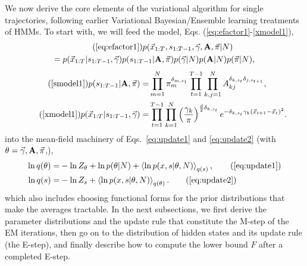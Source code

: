 We now derive the core elements of the variational algorithm for
single trajectories, following earlier Variational Bayesian/Ensemble
learning treatments of HMMs\cite{Bronson2010,Mackay1997,Beal2003}.  To
start with, we will feed the model,
Eqs. (\ref{eq:efactor1}-\ref{xmodel1}),
\begin{multline}
\tag{\ref{eq:efactor1}}
p(\x_{1:T},s_{1:T-1},\vec{\gamma},\matris{A},\vec\pi|N)\\
=p(\x_{1:T}|s_{1:T-1},\vec{\gamma})
p(s_{1:T-1}|\matris{A},\vec\pi)p(\vec{\gamma}|N)p(\matris{A}|N)p(\vec\pi|N),
\end{multline}
\begin{align}
\tag{\ref{smodel1}}
  p(s_{1:T-1}|\matris{A},\vec{\pi})=&
  \prod_{m=1}^N\pi_m^{\delta_{m,s_1}}
  \prod_{t=1}^{T-1}\prod_{k,j=1}^N A_{kj}^{\delta_{k,s_t}\delta_{j,s_{t+1}}},\\
    \tag{\ref{xmodel1}}
    p(\x_{1:T}|s_{1:T-1},\vec\gamma)=&
    \prod_{t=1}^{T-1}\prod_{k=1}^N\left(
    \frac{\gamma_k}{\pi}\right)^{\frac d2\delta_{k,s_t}}
    e^{-\delta_{k,s_t}\gamma_k(\x_{t+1}-\x_t)^2}. 
\end{align}
into the mean-field machinery of Eqs.~\eqref{eq:update1}
and \eqref{eq:update2} (with $\theta=\vec{\gamma},\mathbf{A},\vec{\pi}$,),
\begin{align}
  \ln q(\theta)=&-\ln Z_\theta+\ln p(\theta|N)
  +\mean{\ln p(x,s|\theta,N)}_{q(s)},\tag{\ref{eq:update1}}\\
  \ln q(s)=&-\ln Z_s+\mean{\ln p(x,s|\theta,N)}_{q(\theta)}.
\tag{\ref{eq:update2}}
\end{align}
which also includes choosing functional forms for the prior
distributions that make the averages tractable. In the next
subsections, we first derive the parameter distributions and the
update rule that constitute the M-step of the EM iterations, then go on
to the distribution of hidden states and its update rule (the E-step),
and finally describe how to compute the lower bound $F$ after a
completed E-step.

